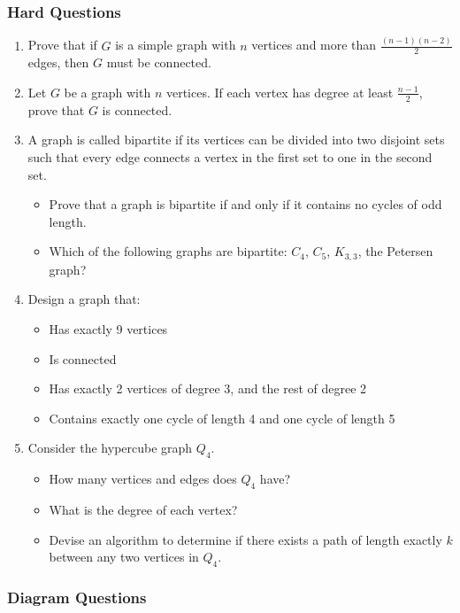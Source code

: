 \documentclass{article}
\theoremstyle{definition}
\begin{document}
\subsubsection{Hard Questions}

\begin{enumerate}[resume]
\item Prove that if $G$ is a simple graph with $n$ vertices and more than $\frac{(n-1)(n-2)}{2}$ edges, then $G$ must be connected.

\item Let $G$ be a graph with $n$ vertices. If each vertex has degree at least $\frac{n-1}{2}$, prove that $G$ is connected.

\item A graph is called bipartite if its vertices can be divided into two disjoint sets such that every edge connects a vertex in the first set to one in the second set.
\begin{itemize}
    \item Prove that a graph is bipartite if and only if it contains no cycles of odd length.
    \item Which of the following graphs are bipartite: $C_4$, $C_5$, $K_{3,3}$, the Petersen graph?
\end{itemize}

\item Design a graph that:
\begin{itemize}
    \item Has exactly 9 vertices
    \item Is connected
    \item Has exactly 2 vertices of degree 3, and the rest of degree 2
    \item Contains exactly one cycle of length 4 and one cycle of length 5
\end{itemize}

\item Consider the hypercube graph $Q_4$.
\begin{itemize}
    \item How many vertices and edges does $Q_4$ have?
    \item What is the degree of each vertex?
    \item Devise an algorithm to determine if there exists a path of length exactly $k$ between any two vertices in $Q_4$.
\end{itemize}
\end{enumerate}

\subsubsection{Diagram Questions}
\end{document}
